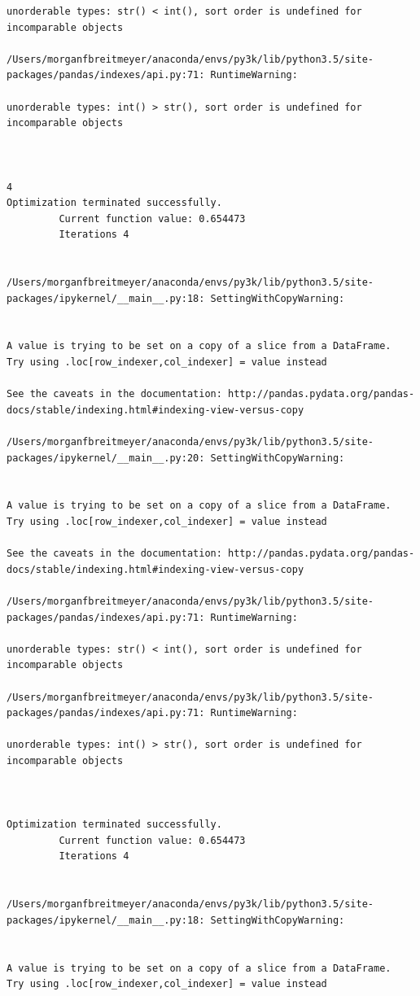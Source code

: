 \begin{lstlisting}
unorderable types: str() < int(), sort order is undefined for incomparable objects

/Users/morganfbreitmeyer/anaconda/envs/py3k/lib/python3.5/site-packages/pandas/indexes/api.py:71: RuntimeWarning:

unorderable types: int() > str(), sort order is undefined for incomparable objects



4
Optimization terminated successfully.
         Current function value: 0.654473
         Iterations 4


/Users/morganfbreitmeyer/anaconda/envs/py3k/lib/python3.5/site-packages/ipykernel/__main__.py:18: SettingWithCopyWarning:


A value is trying to be set on a copy of a slice from a DataFrame.
Try using .loc[row_indexer,col_indexer] = value instead

See the caveats in the documentation: http://pandas.pydata.org/pandas-docs/stable/indexing.html#indexing-view-versus-copy

/Users/morganfbreitmeyer/anaconda/envs/py3k/lib/python3.5/site-packages/ipykernel/__main__.py:20: SettingWithCopyWarning:


A value is trying to be set on a copy of a slice from a DataFrame.
Try using .loc[row_indexer,col_indexer] = value instead

See the caveats in the documentation: http://pandas.pydata.org/pandas-docs/stable/indexing.html#indexing-view-versus-copy

/Users/morganfbreitmeyer/anaconda/envs/py3k/lib/python3.5/site-packages/pandas/indexes/api.py:71: RuntimeWarning:

unorderable types: str() < int(), sort order is undefined for incomparable objects

/Users/morganfbreitmeyer/anaconda/envs/py3k/lib/python3.5/site-packages/pandas/indexes/api.py:71: RuntimeWarning:

unorderable types: int() > str(), sort order is undefined for incomparable objects



Optimization terminated successfully.
         Current function value: 0.654473
         Iterations 4


/Users/morganfbreitmeyer/anaconda/envs/py3k/lib/python3.5/site-packages/ipykernel/__main__.py:18: SettingWithCopyWarning:


A value is trying to be set on a copy of a slice from a DataFrame.
Try using .loc[row_indexer,col_indexer] = value instead


\end{lstlisting}
